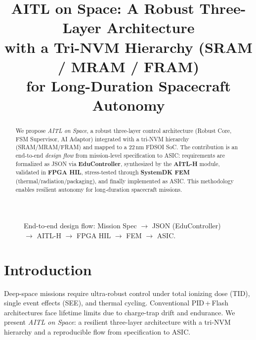 \documentclass[conference]{IEEEtran}
\title{AITL on Space: A Robust Three-Layer Architecture\\
with a Tri-NVM Hierarchy (SRAM / MRAM / FRAM)\\
for Long-Duration Spacecraft Autonomy}
\author{
\IEEEauthorblockN{Shinichi Samizo}
\IEEEauthorblockA{Independent Semiconductor Researcher\\
Former Engineer at Seiko Epson Corporation\\
Email: shin3t72@gmail.com\quad GitHub: \url{https://github.com/Samizo-AITL}}
}
\begin{document}
\maketitle

\begin{abstract}
We propose \emph{AITL on Space}, a robust three-layer control architecture (Robust Core, FSM Supervisor, AI Adaptor) integrated with a tri-NVM hierarchy (SRAM/MRAM/FRAM) and mapped to a 22\,nm FD\!SOI SoC. The contribution is an end-to-end \emph{design flow} from mission-level specification to ASIC: requirements are formalized as JSON via \textbf{EduController}, synthesized by the \textbf{AITL-H} module, validated in \textbf{FPGA HIL}, stress-tested through \textbf{SystemDK FEM} (thermal/radiation/packaging), and finally implemented as ASIC. This methodology enables resilient autonomy for long-duration spacecraft missions.
\end{abstract}

\begin{figure*}[!t]
\centering
{}
\caption{End-to-end design flow: Mission Spec $\rightarrow$ JSON (EduController) $\rightarrow$ AITL-H $\rightarrow$ FPGA HIL $\rightarrow$ FEM $\rightarrow$ ASIC.}
\label{fig:flow}
\end{figure*}

\section{Introduction}
Deep-space missions require ultra-robust control under total ionizing dose (TID), single event effects (SEE), and thermal cycling. Conventional PID\,+\,Flash architectures face lifetime limits due to charge-trap drift and endurance. We present \emph{AITL on Space}: a resilient three-layer architecture with a tri-NVM hierarchy and a reproducible flow from specification to ASIC.
\end{document}
